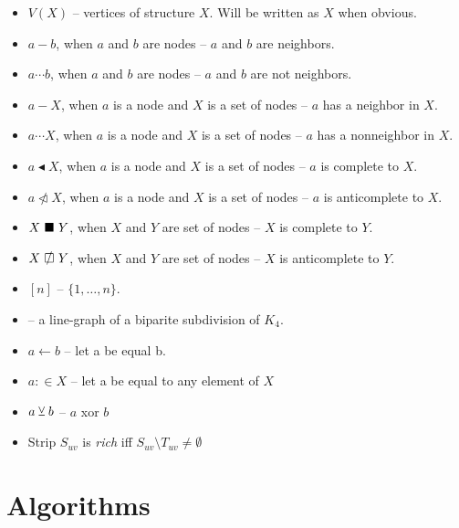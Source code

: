 \documentclass{report}
\begin{document}
\begin{itemize}
	\item $V(X)$ -- vertices of structure $X$. Will be written as $X$ when obvious.
	\item $a - b$, when $a$ and $b$ are nodes -- $a$ and $b$ are neighbors.
	\item $a \cdots b$, when $a$ and $b$ are nodes -- $a$ and $b$ are not neighbors.
	\item $a - X$, when $a$ is a node and $X$ is a set of nodes -- $a$ has a neighbor in $X$.
	\item $a \cdots X$, when $a$ is a node and $X$ is a set of nodes -- $a$ has a nonneighbor in $X$.
	\item $a \blacktriangleleft  X$, when $a$ is a node and $X$ is a set of nodes -- $a$ is complete to $X$.
	\item $a \ntriangleleft X$, when $a$ is a node and $X$ is a set of nodes -- $a$ is anticomplete to $X$.
	\item $X \ \blacksquare\  Y$, when $X$ and $Y$ are set of nodes -- $X$ is complete to $Y$.
	\item $X \setAntiComplete Y$, when $X$ and $Y$ are set of nodes -- $X$ is anticomplete to $Y$.
	\item $[n]$  -- $\{1, \ldots, n\}$.
	\item \LGBSK -- a line-graph of a biparite subdivision of $K_4$.
	\item $a \gets b$ -- let a be equal b.
	\item $a :\in X$ -- let a be equal to any element of $X$
	\item $a \veebar b$ -- $a$ xor $b$

	\item Strip $S_{uv}$ is \emph{rich} iff $S_{uv} \setminus T_{uv} \neq \emptyset$
\end{itemize}

\section{Algorithms}


\clearpage


\clearpage


\clearpage


\clearpage
\end{document}
